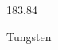 \documentclass[12pt]{article}
\begin{document}
\hfill{}
\vfill
\begin{center}
  {\fontsize{50}{60}
  }

  183.84

Tungsten
\end{center}
\vfill
\end{document}
